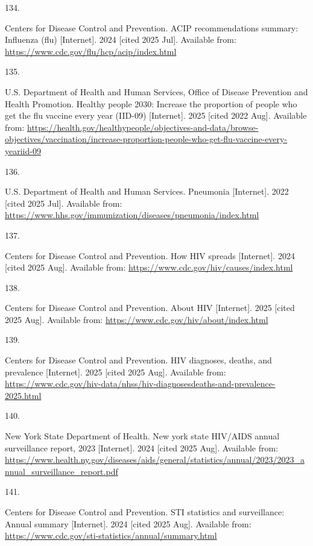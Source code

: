\documentclass[
  english,
  letterpaper,
]{report}
\newlength{\cslhangindent}
\newlength{\csllabelwidth}
\newenvironment{CSLReferences}[2] %
 {\begin{list}{}{%
  \setlength{\itemindent}{0pt}
  \setlength{\leftmargin}{0pt}
  \setlength{\parsep}{0pt}
  \ifodd #1
   \setlength{\leftmargin}{\cslhangindent}
   \setlength{\itemindent}{-1\cslhangindent}
  \fi
  \setlength{\itemsep}{#2\baselineskip}}}
 {\end{list}}
\newcommand{\CSLLeftMargin}[1]{\parbox[t]{\csllabelwidth}{\strut#1\strut}}
\newcommand{\CSLRightInline}[1]{\parbox[t]{\linewidth - \csllabelwidth}{\strut#1\strut}}
\begin{document}
\begin{CSLReferences}{0}{1}
\CSLLeftMargin{134. }%
\CSLRightInline{Centers for Disease Control and Prevention. ACIP
recommendations summary: Influenza (flu) {[}Internet{]}. 2024 {[}cited
2025 Jul{]}. Available from:
\url{https://www.cdc.gov/flu/hcp/acip/index.html}}

\CSLLeftMargin{135. }%
\CSLRightInline{U.S. Department of Health and Human Services, Office of
Disease Prevention and Health Promotion. Healthy people 2030: Increase
the proportion of people who get the flu vaccine every year (IID-09)
{[}Internet{]}. 2025 {[}cited 2022 Aug{]}. Available from:
\url{https://health.gov/healthypeople/objectives-and-data/browse-objectives/vaccination/increase-proportion-people-who-get-flu-vaccine-every-yeariid-09}}

\CSLLeftMargin{136. }%
\CSLRightInline{U.S. Department of Health and Human Services. Pneumonia
{[}Internet{]}. 2022 {[}cited 2025 Jul{]}. Available from:
\url{https://www.hhs.gov/immunization/diseases/pneumonia/index.html}}

\CSLLeftMargin{137. }%
\CSLRightInline{Centers for Disease Control and Prevention. How HIV
spreads {[}Internet{]}. 2024 {[}cited 2025 Aug{]}. Available from:
\url{https://www.cdc.gov/hiv/causes/index.html}}

\CSLLeftMargin{138. }%
\CSLRightInline{Centers for Disease Control and Prevention. About HIV
{[}Internet{]}. 2025 {[}cited 2025 Aug{]}. Available from:
\url{https://www.cdc.gov/hiv/about/index.html}}

\CSLLeftMargin{139. }%
\CSLRightInline{Centers for Disease Control and Prevention. HIV
diagnoses, deaths, and prevalence {[}Internet{]}. 2025 {[}cited 2025
Aug{]}. Available from:
\url{https://www.cdc.gov/hiv-data/nhss/hiv-diagnosesdeaths-and-prevalence-2025.html}}

\CSLLeftMargin{140. }%
\CSLRightInline{New York State Department of Health. New york state
HIV/AIDS annual surveillance report, 2023 {[}Internet{]}. 2024 {[}cited
2025 Aug{]}. Available from:
\url{https://www.health.ny.gov/diseases/aids/general/statistics/annual/2023/2023_annual_surveillance_report.pdf}}

\CSLLeftMargin{141. }%
\CSLRightInline{Centers for Disease Control and Prevention. STI
statistics and surveillance: Annual summary {[}Internet{]}. 2024
{[}cited 2025 Aug{]}. Available from:
\url{https://www.cdc.gov/sti-statistics/annual/summary.html}}


\end{CSLReferences}
\end{document}
